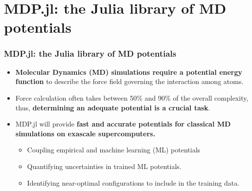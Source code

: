 \documentclass[10pt]{beamer}
\theoremstyle{remark}
\theoremstyle{definition}
\begin{document}
 


\section{MDP.jl: the Julia library of MD potentials}

\begin{frame}
\frametitle{MDP.jl: the Julia library of MD potentials}

\begin{itemize}

\item \textbf{Molecular Dynamics (MD) simulations require a potential energy function} to describe the force field governing the interaction among atoms.
\pause
\item Force calculation often takes between 50\% and 90\% of the overall complexity, thus, \textbf{determining an adequate potential is a crucial task}.
\pause
\item MDP.jl will provide \textbf{fast and accurate potentials for classical MD simulations on exascale supercomputers.}
\begin{itemize}
    \item Coupling empirical and machine learning (ML) potentials
    \item Quantifying uncertainties in trained ML potentials. 
    \item Identifying near-optimal configurations to include in the training data.
\end{itemize}

\end{itemize}
\end{frame}

\end{document}
